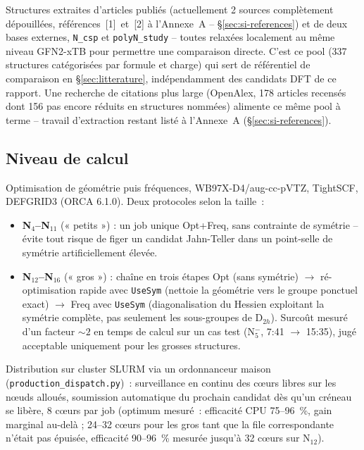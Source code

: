 \documentclass[11pt,a4paper]{article}
\begin{document}
\begin{description}[leftmargin=1.2em,style=nextline]
\item[Pool~3 -- structures issues de la litt\'erature (\texttt{biblio\_polyN})]
Structures extraites d'articles publi\'es (actuellement 2 sources
compl\`etement d\'epouill\'ees, r\'ef\'erences~[1]~et~[2] \`a
l'Annexe~A -- \S\ref{sec:si-references}) et de deux bases externes,
\texttt{N\_csp} et \texttt{polyN\_study} -- toutes relax\'ees
localement au m\^eme niveau GFN2-xTB pour permettre une comparaison
directe. C'est ce pool (337 structures cat\'egoris\'ees par formule et
charge) qui sert de r\'ef\'erentiel de comparaison en
\S\ref{sec:litterature}, ind\'ependamment des candidats DFT de ce
rapport. Une recherche de citations plus large (OpenAlex, 178 articles
recens\'es dont 156 pas encore r\'eduits en structures nomm\'ees) alimente
ce m\^eme pool \`a terme -- travail d'extraction restant list\'e \`a
l'Annexe~A (\S\ref{sec:si-references}).
\end{description}

\subsection{Niveau de calcul}

Optimisation de g\'eom\'etrie puis fr\'equences, WB97X-D4/aug-cc-pVTZ,
TightSCF, DEFGRID3 (ORCA 6.1.0). Deux protocoles selon la taille~:

\begin{itemize}[leftmargin=1.4em]
  \item \textbf{N$_4$--N$_{11}$} (« petits ») : un job unique Opt+Freq,
  sans contrainte de sym\'etrie -- \'evite tout risque de figer un
  candidat Jahn-Teller dans un point-selle de sym\'etrie artificiellement
  \'elev\'ee.
  \item \textbf{N$_{12}$--N$_{16}$} (« gros ») : cha\^ine en trois \'etapes
  Opt (sans sym\'etrie) $\to$ r\'e-optimisation rapide avec \texttt{UseSym}
  (nettoie la g\'eom\'etrie vers le groupe ponctuel exact) $\to$ Freq avec
  \texttt{UseSym} (diagonalisation du Hessien exploitant la sym\'etrie
  compl\`ete, pas seulement les sous-groupes de D$_{2h}$). Surco\^ut mesur\'e
  d'un facteur ${\sim}2$ en temps de calcul sur un cas test (N$_5^-$,
  7:41 $\to$ 15:35), jug\'e acceptable uniquement pour les grosses
  structures.
\end{itemize}

Distribution sur cluster SLURM via un ordonnanceur maison
(\texttt{production\_dispatch.py})~: surveillance en continu des c\oe urs
libres sur les n\oe uds allou\'es, soumission automatique du prochain
candidat d\`es qu'un cr\'eneau se lib\`ere, 8 c\oe urs par job (optimum
mesur\'e~: efficacit\'e CPU 75--96~\%, gain marginal au-del\`a ; 24--32
c\oe urs pour les gros tant que la file correspondante n'\'etait pas
\'epuis\'ee, efficacit\'e 90--96~\% mesur\'ee jusqu'\`a 32 c\oe urs sur
N$_{12}$).
\end{document}
